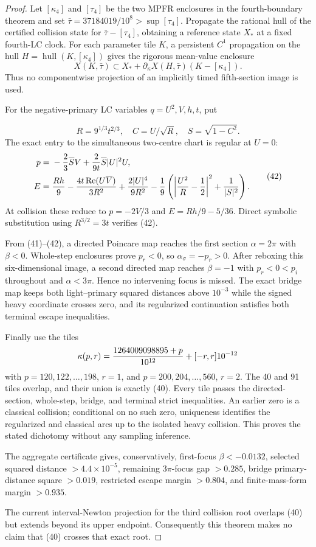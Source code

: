 \documentclass[11pt]{article}
\begin{document}
\begin{proof}
Let \([\kappa_4]\) and \([\tau_4]\) be the two MPFR enclosures in the
fourth-boundary theorem and set
\(\bar\tau=37184019/10^8>\sup[\tau_4]\).  Propagate the rational hull of the
certified collision state for \(\bar\tau-[\tau_4]\), obtaining a reference
state \(X_*\) at a fixed fourth-LC clock.  For each parameter tile $K$, a
persistent $C^1$ propagation on the hull
$H=\operatorname{hull}(K,[\kappa_4])$ gives the rigorous mean-value enclosure
\[
 X(K,\bar\tau)\subset
 X_*+\partial_\kappa X(H,\bar\tau)(K-[\kappa_4]).        \tag{41}
\]
Thus no componentwise projection of an implicitly timed fifth-section image
is used.

For the negative-primary LC variables $q=U^2,V,h,t$, put

\[
 R=9^{1/3}t^{2/3},\quad C=U/\sqrt R,\quad S=\sqrt{1-C^2}.
\]
The exact entry to the simultaneous two-centre chart is regular at $U=0$:
\[
\begin{split}
 p={}&-{2\over3}\overline S V
      +{2\over9t}\overline S|U|^2U,\\
 E={}&{Rh\over9}-{4t\operatorname{Re}(U\overline V)\over3R^2}
      +{2|U|^4\over9R^2}
      -{1\over9}\left(\left|{U^2\over R}-{1\over2}\right|^2
                       +{1\over|S|^2}\right).
\end{split}
                                                               \tag{42}
\]
At collision these reduce to $p=-2V/3$ and $E=Rh/9-5/36$.
Direct symbolic substitution using $R^{3/2}=3t$ verifies (42).

From (41)--(42), a directed Poincare map reaches the first section
\(\alpha=2\pi\) with \(\beta<0\).  Whole-step enclosures prove $p_r<0$,
so \(\alpha_\sigma=-p_r>0\).  After reboxing this six-dimensional image, a
second directed map reaches \(\beta=-1\) with
\(p_r<0<p_i\) throughout and \(\alpha<3\pi\).  Hence no intervening focus is
missed.  The exact bridge map keeps both light--primary squared distances
above $10^{-3}$ while the signed heavy coordinate crosses zero, and its
regularized continuation satisfies both terminal escape inequalities.

Finally use the tiles
\[
 \kappa(p,r)={1264009098895+p\over10^{12}}+[-r,r]10^{-12}
\]
with $p=120,122,\ldots,198$, $r=1$, and
$p=200,204,\ldots,560$, $r=2$.  The 40 and 91 tiles overlap, and their union
is exactly (40).  Every tile passes the directed-section, whole-step, bridge,
and terminal strict inequalities.  An earlier zero is a classical collision;
conditional on no such zero, uniqueness identifies the regularized and
classical arcs up to the isolated heavy collision.  This proves the stated
dichotomy without any sampling inference.

The aggregate certificate gives, conservatively, first-focus
$\beta<-0.0132$, selected squared distance $>4.4\times10^{-5}$, remaining
$3\pi$-focus gap $>0.285$, bridge primary-distance square $>0.019$, restricted
escape margin $>0.804$, and finite-mass-form margin $>0.935$.

The current interval-Newton projection for the third collision root overlaps
(40) but extends beyond its upper endpoint.  Consequently this theorem makes
no claim that (40) crosses that exact root.
\end{proof}
\end{document}

